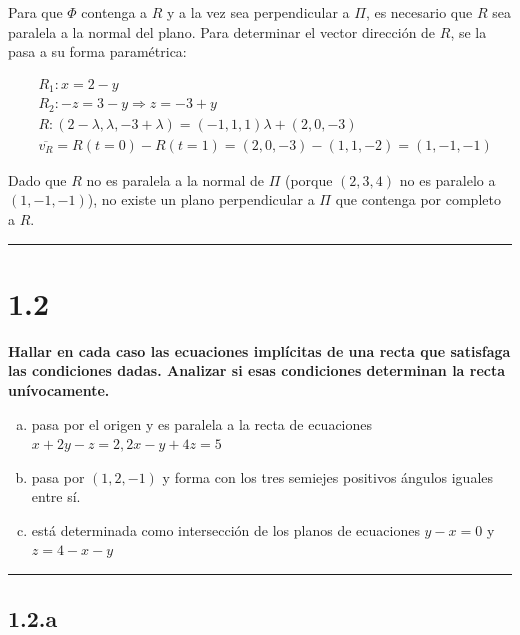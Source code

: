 \documentclass{article}
\begin{document}
Para que $\Phi$ contenga a $R$ y a la vez sea perpendicular a $\Pi$, es necesario que $R$ sea paralela a la normal del plano. Para determinar el vector dirección de $R$, se la pasa a su forma paramétrica:

\begin{subequations}
\begin{align}
& R_1: x = 2 - y \\
& R_2: -z = 3 - y \Rightarrow z = -3 + y \\
& R: (2-\lambda, \lambda, -3+\lambda) = (-1, 1, 1) \lambda + (2, 0, -3) \\
& \overline{v_R} = R(t=0) - R(t=1) = (2, 0, -3) - (1, 1, -2) = (1, -1, -1)
\end{align}
\end{subequations}

Dado que $R$ no es paralela a la normal de $\Pi$ (porque $(2, 3, 4)$ no es paralelo a $(1, -1, -1)$), no existe un plano perpendicular a $\Pi$ que contenga por completo a $R$. 

\vspace{10 pt}
\hrule

\section*{1.2}
\label{sec:1.2}

\textbf{Hallar en cada caso las ecuaciones implícitas de una recta que satisfaga las condiciones dadas. Analizar si esas condiciones determinan la recta unívocamente.} 

\begin{enumerate}[(a)]
\bfseries
\item pasa por el origen y es paralela a la recta de ecuaciones $x + 2y -z = 2, 2x - y + 4z = 5$

\item pasa por $(1, 2, -1)$ y forma con los tres semiejes positivos ángulos iguales entre sí.

\item está determinada como intersección de los planos de ecuaciones $y-x = 0$ y $z = 4 - x - y$
\end{enumerate}
\hrule

\subsection*{1.2.a}
\label{subsec:1.2.a}
\end{document}
